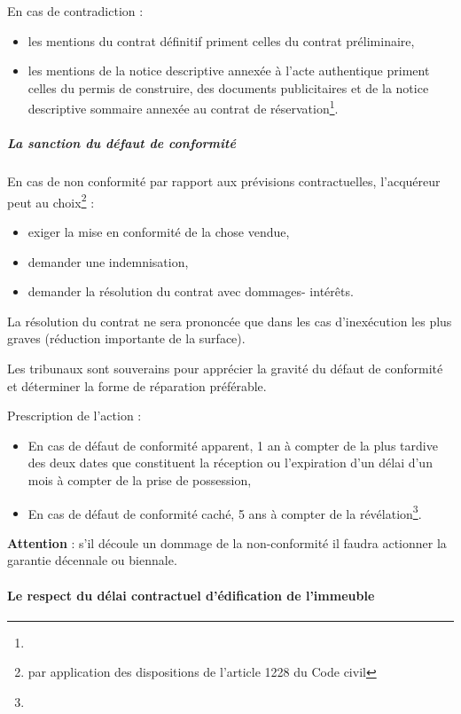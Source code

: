 					\bigbreak En cas de contradiction :
					\begin{itemize}
						\item les mentions du contrat définitif priment celles du contrat préliminaire,
						\item les mentions de la notice descriptive annexée à l'acte authentique priment celles du permis de construire, des documents publicitaires et de la notice descriptive sommaire annexée au contrat de réservation\footnote{}.
					\end{itemize}

				\subparagraph{La sanction du défaut de conformité}

					En cas de non conformité par rapport aux prévisions contractuelles, l’acquéreur peut au choix\footnote{par application des dispositions de l'article 1228 du Code civil} :
					\begin{itemize}
						\item exiger la mise en conformité de la chose vendue,
						\item demander une indemnisation,
						\item demander la résolution du contrat avec dommages- intérêts.
					\end{itemize}

					La résolution du contrat ne sera prononcée que dans les cas d’inexécution les plus graves (réduction importante de la surface).

					Les tribunaux sont souverains pour apprécier la gravité du défaut de conformité et déterminer la forme de réparation préférable.

					Prescription de l’action :
					\begin{itemize}
						\item En cas de défaut de conformité apparent, 1 an à compter de la plus tardive des deux dates que constituent la réception ou l’expiration d’un délai d’un mois à compter de la prise de possession,
						\item En cas de défaut de conformité caché, 5 ans à compter de la révélation\footnote{}.
					\end{itemize}


					\textbf{Attention} : s’il découle un dommage de la non-conformité il faudra actionner la garantie décennale ou biennale.


			\paragraph{Le respect du délai contractuel d'édification de l'immeuble}

